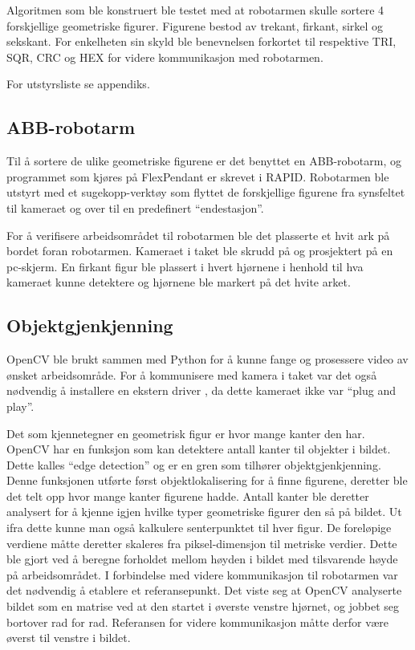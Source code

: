 \documentclass[conference]{IEEEtran}
\begin{document}
    Algoritmen som ble konstruert ble testet med at robotarmen skulle sortere 4 forskjellige geometriske figurer. Figurene bestod av trekant, firkant, sirkel og sekskant. For enkelheten sin skyld ble benevnelsen forkortet til respektive TRI, SQR, CRC og HEX for videre kommunikasjon 
    med robotarmen. 
    
    For utstyrsliste se appendiks. 
    
    \subsection{ABB-robotarm}
        Til å sortere de ulike geometriske figurene er det benyttet en ABB-robotarm, og programmet som kjøres på FlexPendant er skrevet i RAPID. 
        Robotarmen ble utstyrt med et sugekopp-verktøy som flyttet de forskjellige figurene fra synsfeltet til kameraet og over til en predefinert 
        \enquote{endestasjon}. 

        For å verifisere arbeidsområdet til robotarmen ble det plasserte et hvit ark på bordet foran robotarmen. Kameraet i taket ble skrudd på og 
        prosjektert på en pc-skjerm. En firkant figur ble plassert i hvert hjørnene i henhold til hva kameraet kunne detektere og hjørnene ble markert 
        på det hvite arket.

    \subsection{Objektgjenkjenning}
        OpenCV ble brukt sammen med Python for å kunne fange og prosessere video av ønsket arbeidsområde. For å kommunisere med kamera i taket 
        var det også nødvendig å installere en ekstern driver \cite{metode:kamera}, da dette kameraet ikke var “plug and play”.

        Det som kjennetegner en geometrisk figur er hvor mange kanter den har. OpenCV har en funksjon som kan detektere antall kanter til objekter i bildet. Dette kalles \enquote{edge detection} og er en gren som tilhører objektgjenkjenning. Denne funksjonen utførte først objektlokalisering for å finne figurene, deretter ble det telt opp hvor mange kanter figurene hadde. Antall kanter ble deretter analysert for å kjenne igjen hvilke typer geometriske figurer den så på bildet. Ut ifra dette kunne man også kalkulere senterpunktet til hver figur. De foreløpige verdiene måtte deretter skaleres fra piksel-dimensjon til metriske verdier. Dette ble gjort ved å beregne forholdet mellom høyden i bildet med tilsvarende høyde på arbeidsområdet. I forbindelse med videre kommunikasjon til robotarmen var det nødvendig å etablere et referansepunkt.  Det viste seg at OpenCV analyserte bildet som en matrise ved at den startet i øverste venstre hjørnet, og jobbet seg bortover rad for rad. Referansen for videre kommunikasjon måtte derfor være øverst til venstre i bildet.
\end{document}
